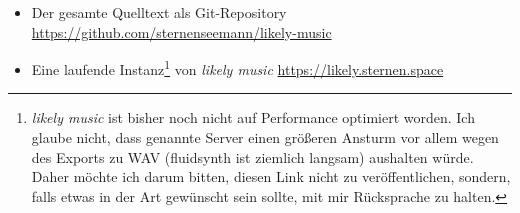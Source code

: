 \documentclass[a4paper,twocolumn]{article}
\begin{document}
\begin{itemize}
\item Der gesamte Quelltext als Git-Repository \url{https://github.com/sternenseemann/likely-music}
\item Eine laufende Instanz\footnote{{\it likely music} ist bisher noch nicht
  auf Performance optimiert worden. Ich glaube nicht, dass genannte Server einen
    größeren Ansturm vor allem wegen des Exports zu WAV (fluidsynth
    \cite{fluidsynth} ist ziemlich
    langsam) aushalten würde. Daher möchte ich darum bitten, diesen Link nicht
    zu veröffentlichen, sondern, falls etwas in der Art gewünscht sein sollte,
    mit mir Rücksprache zu halten.} von {\it likely music} \url{https://likely.sternen.space}
\end{itemize}

\end{document}

